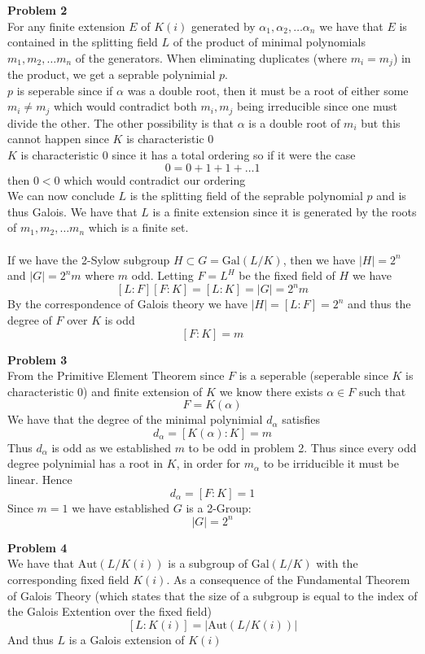 \documentclass[12pt]{article}
\newenvironment{ques}[1]{\textbf{Problem #1}\vspace{1 mm}\\ }{\bigskip}
\theoremstyle{definition}
\renewcommand{\a}{\alpha}
\newcommand{\Aut}{\text{Aut}}
\newcommand{\Gal}{\text{Gal}}
\begin{document}
\begin{ques}{2}
	For any finite extension $E$ of $K(i)$ generated by $\a_1, \a_2, \dots
	\a_n$ we have that $E$ is contained in the splitting field $L$ of the product
	of minimal polynomials $m_1, m_2, \dots m_n$ of the generators. When
	eliminating duplicates (where $m_i = m_j$) in the product, we get a
	seprable polynimial $p$. \\
	$p$ is seperable since if $\a$ was a double root,
	then it must be a root of either some $m_i \neq m_j$ which would contradict
	both $m_i, m_j$ being irreducible since one must divide the other. The
	other possibility is that $\a$ is a double root of $m_i$ but this cannot
	happen since $K$ is characteristic $0$ \\
	$K$ is characteristic $0$ since it has a total ordering so if it were the case
	$$0 = 0 + 1 + 1 + \dots 1$$
	then $0 < 0$ which would contradict our ordering
	\\
	We can now conclude $L$ is the splitting field of
	the seprable polynomial $p$ and is thus Galois. We have that $L$ is a
	finite extension since it is generated by the roots of $m_1, m_2, \dots
	m_n$ which is a finite set.\\
	\\
	If we have the 2-Sylow subgroup $H \subset G = \Gal(L/K)$, then we have
	$|H| = 2^n$ and $|G| = 2^nm$ where $m$ odd. Letting $F = L^H$ be the fixed
	field of $H$ we have
	$$[L:F][F:K] = [L:K] = |G| = 2^nm$$
	By the correspondence of Galois theory we have $|H| = [L:F] = 2^n$ and thus
	the degree of $F$ over $K$ is odd
	$$[F:K] = m$$
\end{ques}

\begin{ques}{3}
	From the Primitive Element Theorem since $F$ is a seperable (seperable
	since $K$ is characteristic $0$) and finite extension of $K$ we know there
	exists $\a \in F$ such that 
	$$F = K(\a)$$
	We have that the degree of the minimal polynimial $d_\a$ satisfies
	$$d_\a = [K(\a) : K] = m$$
	Thus $d_\a$ is odd as we established $m$ to be odd in problem 2. Thus since
	every odd degree polynimial has a root in $K$, in order for $m_\a$ to be
	irriducible it must be linear. Hence 
	$$d_\a = [F : K] = 1$$
	Since $m = 1$ we have established $G$ is a 2-Group:
	$$|G| = 2^n$$
\end{ques}

\begin{ques}{4}
	We have that $\Aut(L/K(i))$ is a subgroup of $\Gal(L/K)$ with the
	corresponding fixed field $K(i)$. As a consequence of the
	Fundamental Theorem of Galois Theory (which states that the size of a
	subgroup is equal to the index of the Galois Extention over the fixed
	field)
	$$[L:K(i)] = |\Aut(L/K(i))|$$
	And thus $L$ is a Galois extension of $K(i)$
\end{ques}
\end{document}
